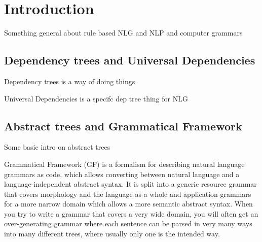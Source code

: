 \documentclass{article}
\begin{document}



\section{Introduction}
Something general about rule based NLG and NLP
and computer grammars

\subsection{Dependency trees and Universal Dependencies}
Dependency trees is a way of doing things 

Universal Dependencies is a specifc dep tree thing for NLG 


\subsection{Abstract trees and Grammatical Framework}

Some basic intro on abstract trees
 

Grammatical Framework\cite{ranta-2004} (GF) is a formalism for describing natural language grammars as code, which allows converting between natural language and a language-independent abstract syntax. It is split into a generic resource grammar that covers morphology and the language as a whole and application grammars for a more narrow domain which allows a more semantic abstract syntax. When you try to write a grammar that covers a very wide domain, you will often get an over-generating grammar where each sentence can be parsed in very many ways into many different trees, where usually only one is the intended way.
\end{document}
